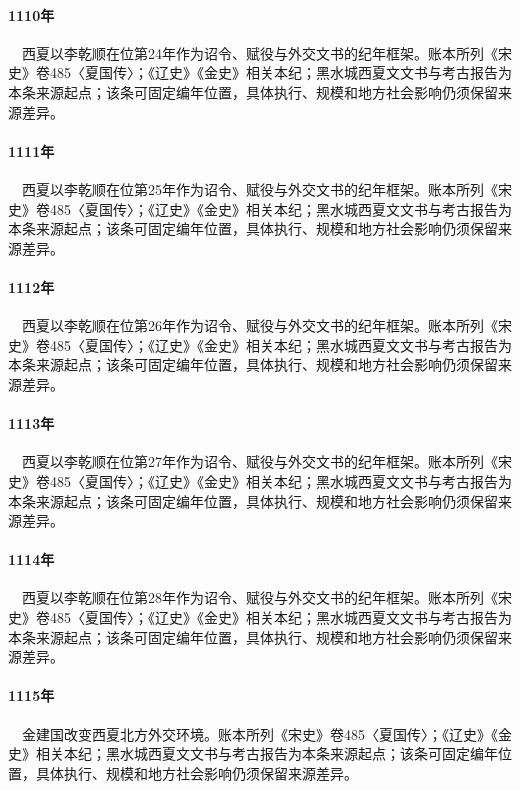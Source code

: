 \paragraph{1110年}　西夏以李乾顺在位第24年作为诏令、赋役与外交文书的纪年框架。账本所列《宋史》卷485〈夏国传〉；《辽史》《金史》相关本纪；黑水城西夏文文书与考古报告为本条来源起点；该条可固定编年位置，具体执行、规模和地方社会影响仍须保留来源差异。

\paragraph{1111年}　西夏以李乾顺在位第25年作为诏令、赋役与外交文书的纪年框架。账本所列《宋史》卷485〈夏国传〉；《辽史》《金史》相关本纪；黑水城西夏文文书与考古报告为本条来源起点；该条可固定编年位置，具体执行、规模和地方社会影响仍须保留来源差异。

\paragraph{1112年}　西夏以李乾顺在位第26年作为诏令、赋役与外交文书的纪年框架。账本所列《宋史》卷485〈夏国传〉；《辽史》《金史》相关本纪；黑水城西夏文文书与考古报告为本条来源起点；该条可固定编年位置，具体执行、规模和地方社会影响仍须保留来源差异。

\paragraph{1113年}　西夏以李乾顺在位第27年作为诏令、赋役与外交文书的纪年框架。账本所列《宋史》卷485〈夏国传〉；《辽史》《金史》相关本纪；黑水城西夏文文书与考古报告为本条来源起点；该条可固定编年位置，具体执行、规模和地方社会影响仍须保留来源差异。

\paragraph{1114年}　西夏以李乾顺在位第28年作为诏令、赋役与外交文书的纪年框架。账本所列《宋史》卷485〈夏国传〉；《辽史》《金史》相关本纪；黑水城西夏文文书与考古报告为本条来源起点；该条可固定编年位置，具体执行、规模和地方社会影响仍须保留来源差异。

\paragraph{1115年}　金建国改变西夏北方外交环境。账本所列《宋史》卷485〈夏国传〉；《辽史》《金史》相关本纪；黑水城西夏文文书与考古报告为本条来源起点；该条可固定编年位置，具体执行、规模和地方社会影响仍须保留来源差异。

